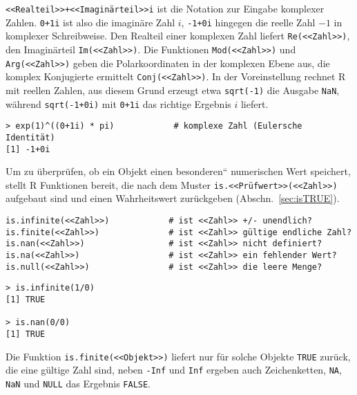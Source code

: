 \lstinline!<<Realteil>>+<<Imaginärteil>>i! ist die Notation zur Eingabe komplexer Zahlen. \lstinline!0+1i! ist also die imaginäre Zahl $i$, \lstinline!-1+0i! hingegen die reelle Zahl $-1$ in komplexer Schreibweise. Den Realteil einer komplexen Zahl liefert \lstinline!Re(<<Zahl>>)!, den Imaginärteil \lstinline!Im(<<Zahl>>)!. Die Funktionen \lstinline!Mod(<<Zahl>>)! und \lstinline!Arg(<<Zahl>>)! geben die Polarkoordinaten in der komplexen Ebene aus, die komplex Konjugierte ermittelt  \lstinline!Conj(<<Zahl>>)!. In der Voreinstellung rechnet R mit reellen Zahlen, aus diesem Grund erzeugt etwa \lstinline!sqrt(-1)! die Ausgabe \lstinline!NaN!, während \lstinline!sqrt(-1+0i)! mit \lstinline!0+1i! das richtige Ergebnis $i$ liefert.
\begin{lstlisting}
> exp(1)^((0+1i) * pi)            # komplexe Zahl (Eulersche Identität)
[1] -1+0i
\end{lstlisting}

Um zu überprüfen, ob ein Objekt einen {\quotedblbase}besonderen{\textquotedblleft} numerischen Wert speichert, stellt R Funktionen bereit, die nach dem Muster \lstinline!is.<<Prüfwert>>(<<Zahl>>)! aufgebaut sind und einen Wahrheitswert zurückgeben (Abschn.\ \ref{sec:isTRUE}).
\begin{lstlisting}
is.infinite(<<Zahl>>)            # ist <<Zahl>> +/- unendlich?
is.finite(<<Zahl>>)              # ist <<Zahl>> gültige endliche Zahl?
is.nan(<<Zahl>>)                 # ist <<Zahl>> nicht definiert?
is.na(<<Zahl>>)                  # ist <<Zahl>> ein fehlender Wert?
is.null(<<Zahl>>)                # ist <<Zahl>> die leere Menge?
\end{lstlisting}

\begin{lstlisting}
> is.infinite(1/0)
[1] TRUE

> is.nan(0/0)
[1] TRUE
\end{lstlisting}

Die Funktion \lstinline!is.finite(<<Objekt>>)! liefert nur für solche Objekte \lstinline!TRUE! zurück, die eine gültige Zahl sind, neben \lstinline!-Inf! und \lstinline!Inf! ergeben auch Zeichenketten, \lstinline!NA!, \lstinline!NaN! und \lstinline!NULL! das Ergebnis \lstinline!FALSE!.

